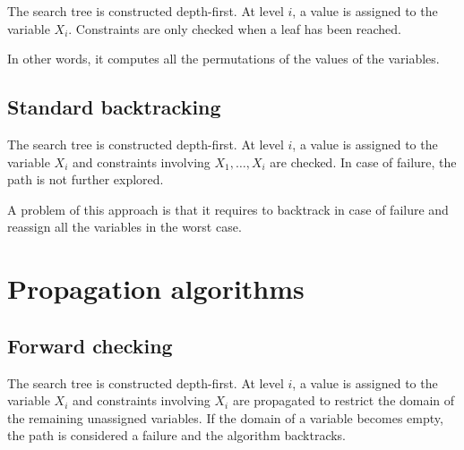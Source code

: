 The search tree is constructed depth-first. 
At level $i$, a value is assigned to the variable $X_i$.
Constraints are only checked when a leaf has been reached.

In other words, it computes all the permutations of the values of the variables.


\subsection{Standard backtracking}

The search tree is constructed depth-first. 
At level $i$, a value is assigned to the variable $X_i$ and 
constraints involving $X_1, \dots, X_i$ are checked.
In case of failure, the path is not further explored.

A problem of this approach is that it requires to backtrack in case of failure
and reassign all the variables in the worst case.



\section{Propagation algorithms}

\subsection{Forward checking}

The search tree is constructed depth-first. 
At level $i$, a value is assigned to the variable $X_i$ and 
constraints involving $X_i$ are propagated
to restrict the domain of the remaining unassigned variables.
If the domain of a variable becomes empty, the path is considered a failure and the algorithm backtracks.

